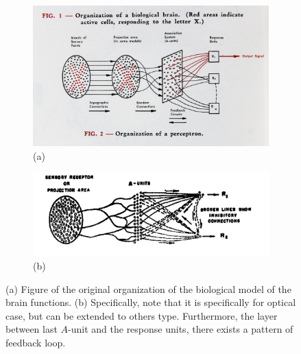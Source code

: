\begin{figure}[h!]
  \centering
  \begin{subfigure}{0.4\textwidth}
    \centering
    \includegraphics[width=\textwidth]{img/0925_rosenblatt4.jpg}
    \caption*{(a)}
  \end{subfigure}
  \hspace{5mm}
  \begin{subfigure}{0.4\textwidth}
    \centering
    \includegraphics[width=1.1\textwidth]{img/A_unit_receptors.png}
    \caption*{(b)}
  \end{subfigure}
  \caption{(a) Figure of the original organization of the biological model of the brain functions. (b) Specifically, note that it is specifically for optical case, but can be extended to others type. Furthermore, the layer between last $A$-unit and the response units, there exists a pattern of feedback loop.}
\end{figure}


